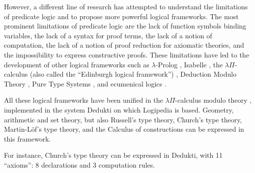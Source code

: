 However, a different line of research has attempted to understand the
limitations of predicate logic and to propose more powerful logical
frameworks.  The most prominent limitations of predicate logic are the
lack of function symbols binding variables, the lack of a syntax for
proof terms, the lack of a notion of computation, the lack of a notion
of proof reduction for axiomatic theories, and the impossibility to
express constructive proofs. These limitations have led to the
development of other logical frameworks such as $\lambda$-Prolog
\cite{MillerNadathur12}, Isabelle \cite{Paulson90},
the $\lambda \Pi$-calculus (also called the ``Edinburgh logical
framework'') \cite{HarperHonsellPlotkin91}, Deduction Modulo Theory
\cite{DowekHardinKirchner03, DowekWerner03}, Pure Type Systems
\cite{Berardi88,Terlouw89}, and ecumenical logics
\cite{Prawitz15,Dowek15,PereiraRodriguez17}.

All these logical frameworks have been unified in the $\lambda
\Pi$-calculus modulo theory \cite{CousineauDowek07}, implemented in
the system Dedukti \cite{Assaf16} on which Logipedia is
based. Geometry, arithmetic and set theory, but also Russell's type
theory, Church's type theory, Martin-L\"of's type theory, and the
Calculus of constructions can be expressed in this framework.

For instance, Church's type
theory can be expressed in Dedukti, with 11 ``axioms'': 8 declarations
and 3 computation rules.

